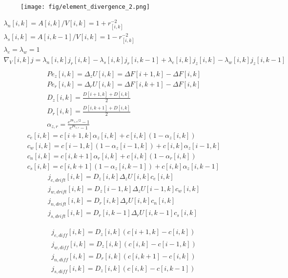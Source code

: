 \documentclass[12pt, a4paper]{article}
\begin{document}
\begin{figure}
    \centering
    \texttt{[image: fig/element\_divergence\_2.png]}
\end{figure}


\begin{eqnarray}
    \lambda_{n}[i,k] = A[i,k]/V[i,k] = 1+r_[i,k]^{-2}
    \\
    \lambda_{s}[i,k] = A[i,k-1]/V[i,k] = 1-r_[i,k]^{-2}
    \\
    \lambda_{e} = \lambda_{w} = 1
    \\
    \nabla_V[i, k] j = \lambda_{n}[i,k] j_r[i,k] - \lambda_{s}[i,k] j_r[i,k-1] + \lambda_{e}[i,k] j_z[i,k] - \lambda_{w}[i,k] j_z[i,k-1]
    \\
\end{eqnarray}
\begin{eqnarray}
    Pe_{z}[i,k] = \Delta_{z} U[i,k] = \Delta F[i+1, k] - \Delta F[i, k]
    \\
    Pe_{r}[i,k] = \Delta_{r} U[i,k] = \Delta F[i, k+1] - \Delta F[i, k]
    \\
    D_{z}[i,k] = \frac{D[i+1,k] + D[i,k]}{2}
    \\
    D_{r}[i,k] = \frac{D[i,k+1] + D[i,k]}{2}
    \\
    \alpha_{z,r} = \frac{e^{Pe_{z,r}/2} - 1}{e^{Pe_{z,r}} - 1}
\end{eqnarray}
\begin{eqnarray}
    c_{e}[i,k] = c[i+1,k] \alpha_{z}[i,k] + c[i, k] (1 - \alpha_{z}[i,k])
    \\
    c_{w}[i,k] = c[i-1,k] (1-\alpha_{z}[i-1,k]) + c[i, k] \alpha_{z}[i-1,k]
    \\
    c_{n}[i,k] = c[i,k+1] \alpha_{r}[i,k] + c[i, k] (1 - \alpha_{r}[i,k])
    \\
    c_{s}[i,k] = c[i,k+1] (1-\alpha_{z}[i,k-1]) + c[i, k] \alpha_{z}[i,k-1]
\end{eqnarray}
\begin{eqnarray}
    j_{e, drift}[i,k] = D_z[i,k] \Delta_{z} U[i,k] c_e[i,k]
    \\
    j_{w, drift}[i,k] = D_z[i-1,k] \Delta_{z} U[i-1,k] c_w[i,k]
    \\
    j_{n, drift}[i,k] = D_r[i,k] \Delta_{r} U[i,k] c_n[i,k]
    \\
    j_{s, drift}[i,k] = D_r[i,k-1] \Delta_{r} U[i,k-1] c_s[i,k]
\end{eqnarray}

\begin{eqnarray}
    j_{e, diff}[i,k] = D_z[i,k]  (c[i+1,k] - c[i,k])
    \\
    j_{w, diff}[i,k] = D_z[i,k]  (c[i,k] - c[i-1,k])
    \\
    j_{n, diff}[i,k] = D_r[i,k]  (c[i,k+1] - c[i,k])
    \\
    j_{s, diff}[i,k] = D_z[i,k]  (c[i,k] - c[i,k-1])
\end{eqnarray}
\end{document}
